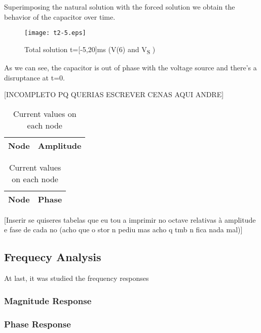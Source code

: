 Superimposing the natural solution with the forced solution we obtain the behavior of the capacitor over time.

\begin{figure}[h] \centering
\texttt{[image: t2-5.eps]}
\caption{Total solution t=[-5,20]ms (V(6) and V\textsubscript S )}
\label{fig:natural}
\end{figure}

As we can see, the capacitor is out of phase with the voltage source and there's a disruptance at t=0.

[INCOMPLETO PQ QUERIAS ESCREVER CENAS AQUI ANDRE]
\begin{table}[!htb]
    \begin{minipage}{.5\linewidth}
      
      \centering
        \begin{tabular}{|c|c|}
        \hline    
        {\bf Node} & {\bf Amplitude} \\ \hline
        
        \end{tabular}
        \caption{Amplitude values on each node}
    \end{minipage}%
    \begin{minipage}{.5\linewidth}
      \centering
        
        \begin{tabular}{|c|c|}
        \hline    
        {\bf Node} & {\bf Phase} \\ \hline
        
        \end{tabular}
        \caption{Current values on each node }
    \end{minipage} 
\end{table}


[Inserir se quiseres tabelas que eu tou a imprimir no octave relativas à amplitude e fase de cada no (acho que o stor n pediu mas acho q tmb n fica nada mal)]

\subsection{Frequecy Analysis}

At last, it was studied the frequency responses


\subsubsection{Magnitude Response}

\subsubsection{Phase Response}


